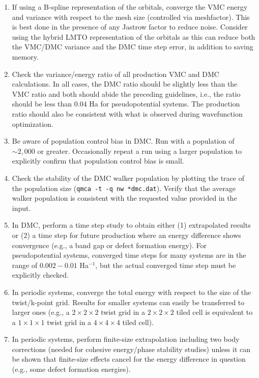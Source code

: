 \begin{enumerate}
  \item{If using a B-spline representation of the orbitals, converge 
    the VMC energy and variance with respect to the mesh size (controlled 
    via meshfactor).  This is best done in the presence of any 
    Jastrow factor to reduce noise.  Consider using the hybrid LMTO 
    representation of the orbitals as this can reduce both the VMC/DMC 
    variance and the DMC time step error, in addition to saving memory.}

  \item{Check the variance/energy ratio of all production VMC and DMC 
    calculations.  In all cases, the DMC ratio should be slightly 
    less than the VMC ratio and both should abide the preceding guidelines, 
    i.e., the ratio should be less than $0.04$ Ha for 
    pseudopotential systems.  The production ratio should also be 
    consistent with what is observed during wavefunction optimization.}

  \item{Be aware of population control bias in DMC.  Run with a 
    population of $\sim 2,000$ or greater.  Occasionally repeat a run 
    using a larger population to explicitly confirm that population 
    control bias is small.}

  \item{Check the stability of the DMC walker population by plotting 
    the trace of the population size (\texttt{qmca -t -q nw *dmc.dat}).  
    Verify that the average walker population is consistent with 
    the requested value provided in the input.}

  \item{In DMC, perform a time step study to obtain either (1) 
    extrapolated results or (2) a time step for future 
    production where an energy difference shows convergence 
    (e.g., a band gap or defect formation energy).  For 
    pseudopotential systems, converged time steps for many systems 
    are in the range of $0.002-0.01$ Ha$^{-1}$, but the actual converged 
    time step must be explicitly checked.}

  \item{In periodic systems, converge the total energy with respect to 
    the size of the twist/k-point grid.  Results for smaller systems 
    can easily be transferred to larger ones (e.g., a $2 \times 2 \times 2$ twist 
    grid in a $2 \times 2 \times 2$ tiled cell is equivalent to a $1 \times 1 \times 1$ twist grid in a 
    $4 \times 4 \times 4$ tiled cell)}.

  \item{In periodic systems, perform finite-size extrapolation 
    including two body corrections (needed for cohesive energy/phase 
    stability studies) unless it can be shown that finite-size effects 
    cancel for the energy difference in question (e.g., some 
    defect formation energies).}

\end{enumerate}


